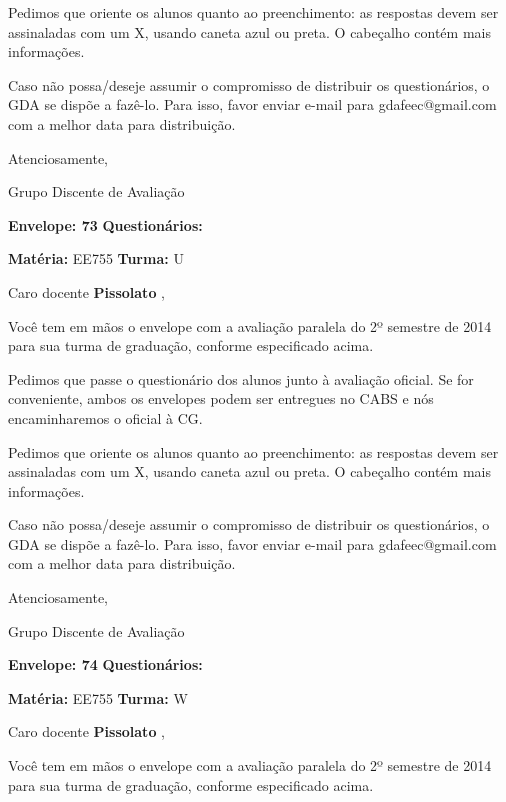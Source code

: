 \documentclass[a5paper]{letter}
\begin{document}
Pedimos que oriente os alunos quanto ao preenchimento: as respostas devem ser assinaladas com um X, usando caneta azul ou preta. O cabeçalho contém mais informações.

	Caso não possa/deseje assumir o compromisso de distribuir os questionários, o GDA se dispõe a fazê-lo. Para isso, favor enviar e-mail para gdafeec@gmail.com com a melhor data para distribuição.


Atenciosamente, 

Grupo Discente de Avaliação

\vspace{0.5cm}

{\bf Envelope: 73 }		\hfill	{\bf Questionários:} \hspace{2cm}

\newpage
\thispagestyle{empty}

\hfill {\bf Matéria:} EE755 {\bf Turma:} U

Caro docente {\bf Pissolato }, 

	Você tem em mãos o envelope com a avaliação paralela do 2º semestre de 2014 para sua turma de graduação, conforme especificado acima.

	Pedimos que passe o questionário dos alunos junto à avaliação oficial. Se for conveniente, ambos os envelopes podem ser entregues no CABS e nós encaminharemos o oficial à CG.

Pedimos que oriente os alunos quanto ao preenchimento: as respostas devem ser assinaladas com um X, usando caneta azul ou preta. O cabeçalho contém mais informações.

	Caso não possa/deseje assumir o compromisso de distribuir os questionários, o GDA se dispõe a fazê-lo. Para isso, favor enviar e-mail para gdafeec@gmail.com com a melhor data para distribuição.


Atenciosamente, 

Grupo Discente de Avaliação

\vspace{0.5cm}

{\bf Envelope: 74 }		\hfill	{\bf Questionários:} \hspace{2cm}

\newpage
\thispagestyle{empty}

\hfill {\bf Matéria:} EE755 {\bf Turma:} W

Caro docente {\bf Pissolato }, 

	Você tem em mãos o envelope com a avaliação paralela do 2º semestre de 2014 para sua turma de graduação, conforme especificado acima.
\end{document}
